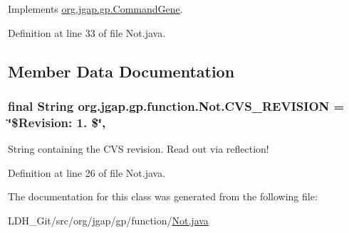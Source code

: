 Implements \hyperlink{classorg_1_1jgap_1_1gp_1_1_command_gene_a236141d99059da808afe7a9217e411c7}{org.\-jgap.\-gp.\-Command\-Gene}.



Definition at line 33 of file Not.\-java.



\subsection{Member Data Documentation}
\hypertarget{classorg_1_1jgap_1_1gp_1_1function_1_1_not_aa7d445c3322eddd97574bce1cbd132bd}{
\subsubsection[{C\-V\-S\-\_\-\-R\-E\-V\-I\-S\-I\-O\-N}]{\setlength{\rightskip}{0pt plus 5cm}final String org.\-jgap.\-gp.\-function.\-Not.\-C\-V\-S\-\_\-\-R\-E\-V\-I\-S\-I\-O\-N = \char`\"{}\$Revision\-: 1. \$\char`\"{}\hspace{0.3cm}{\ttfamily [static]}, {\ttfamily [private]}}}\label{classorg_1_1jgap_1_1gp_1_1function_1_1_not_aa7d445c3322eddd97574bce1cbd132bd}
String containing the C\-V\-S revision. Read out via reflection! 

Definition at line 26 of file Not.\-java.



The documentation for this class was generated from the following file\-:\begin{DoxyCompactItemize}
\item 
L\-D\-H\-\_\-\-Git/src/org/jgap/gp/function/\hyperlink{_not_8java}{Not.\-java}\end{DoxyCompactItemize}
